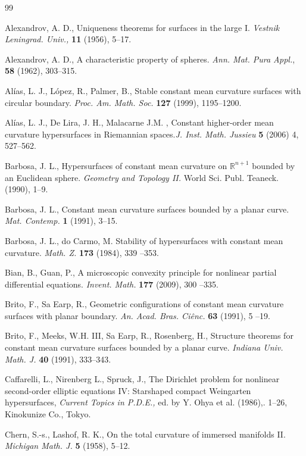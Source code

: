 \documentclass[11pt]{amsart}
\theoremstyle{plain}
\numberwithin{equation}{section}
\numberwithin{theorem}{section}
\begin{document}
\begin{thebibliography}{99} 


Alexandrov, A. D., Uniqueness theorems for surfaces in the large I. \emph{Vestnik Leningrad. Univ.,} \textbf{11} (1956), 5--17.

Alexandrov, A. D., A characteristic property of spheres. \emph{Ann. Mat. Pura Appl.}, \textbf{58} (1962), 303--315.

Al\'ias, L. J., L\'opez, R., Palmer, B., Stable constant mean curvature surfaces with circular boundary. \emph{Proc. Am. Math. Soc.} \textbf{127} (1999), 1195--1200.

Al\'ias, L. J., De Lira, J. H., Malacarne J.M. , Constant higher-order mean curvature hypersurfaces in Riemannian spaces.\emph{J. Inst. Math. Jussieu} \textbf{5} (2006) 4, 527--562.


Barbosa, J. L., Hypersurfaces of constant mean curvature on $\mathbb{R}^{n+1}$ bounded by an Euclidean sphere. \emph{Geometry and Topology II.} World Sci. Publ. Teaneck. (1990), 1--9.

Barbosa, J. L., Constant mean curvature surfaces bounded by a planar curve. \emph{Mat. Contemp.} \textbf{1}  (1991), 3--15.

Barbosa, J. L., do Carmo, M. Stability of hypersurfaces with constant mean curvature. \emph{Math. Z.} \textbf{173}  (1984), 339 --353.

Bian, B., Guan, P., A microscopic convexity principle for nonlinear partial differential equations.  \emph{Invent. Math.} \textbf{177} (2009), 300 --335.

Brito, F., Sa Earp, R., Geometric configurations of constant mean curvature surfaces with planar boundary.  \emph{An. Acad. Bras. Ci\^enc.} \textbf{63} (1991), 5 --19.

Brito, F., Meeks, W.H. III, Sa Earp, R., Rosenberg, H., Structure theorems for constant mean curvature surfaces bounded by a planar curve.
\emph{Indiana Univ. Math. J.} \textbf{40} (1991), 333--343.

Caffarelli, L.,  Nirenberg L., Spruck, J., 
The Dirichlet problem for nonlinear second-order elliptic equations IV: Starshaped compact Weingarten
hypersurfaces, \emph{Current Topics in P.D.E.,} ed. by Y. Ohya et al. (1986),. 1--26, Kinokunize Co., Tokyo.

Chern, S.-s., Lashof, R. K., On the total curvature of immersed manifolds II. 
\emph{Michigan Math. J.} \textbf{5} (1958), 5--12.


\end{thebibliography}
\end{document}
